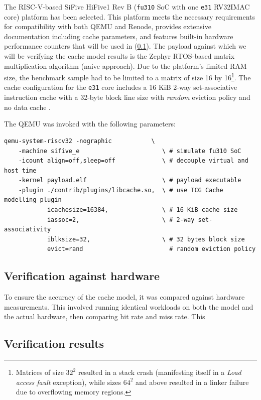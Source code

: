 The RISC-V-based SiFive HiFive1 Rev B (\texttt{fu310} SoC with one \texttt{e31} RV32IMAC core) platform has been selected. This platform meets the necessary requirements for
compatibility with both QEMU and Renode, provides extensive documentation including cache parameters, and features built-in hardware performance counters that will be used in
(\ref{sec:hpc}). The payload against which we will be verifying the cache model results is the Zephyr RTOS-based matrix multiplication algorithm (naive approach). Due to the
platform's limited RAM size, the benchmark sample had to be limited to a matrix of size 16 by 16\footnote{Matrices of size $32^2$ resulted in a stack crash (manifesting itself in
a \textit{Load access fault} exception), while sizes $64^2$ and above resulted in a linker failure due to overflowing memory regions.}. The cache configuration for the \texttt{e31}
core includes a 16 KiB 2-way set-associative instruction cache with a 32-byte block line size with \textit{random} eviction policy and no data cache \cite{fe310docs}.

\noindent The QEMU was invoked with the following parameters:
\begin{verbatim}
qemu-system-riscv32 -nographic           \
	-machine sifive_e                       \ # simulate fu310 SoC
	-icount align=off,sleep=off             \ # decouple virtual and host time
	-kernel payload.elf                     \ # payload executable
	-plugin ./contrib/plugins/libcache.so,  \ # use TCG Cache modelling plugin
	        icachesize=16384,               \ # 16 KiB cache size
	        iassoc=2,                       \ # 2-way set-associativity
	        iblksize=32,                    \ # 32 bytes block size
	        evict=rand                        # random eviction policy
\end{verbatim}


\subsection{Verification against hardware} \label{sec:hpc}
To ensure the accuracy of the cache model, it was compared against hardware measurements. This involved running identical workloads on both the model and the actual hardware, then
comparing hit rate and miss rate. This 

\subsection{Verification results}

